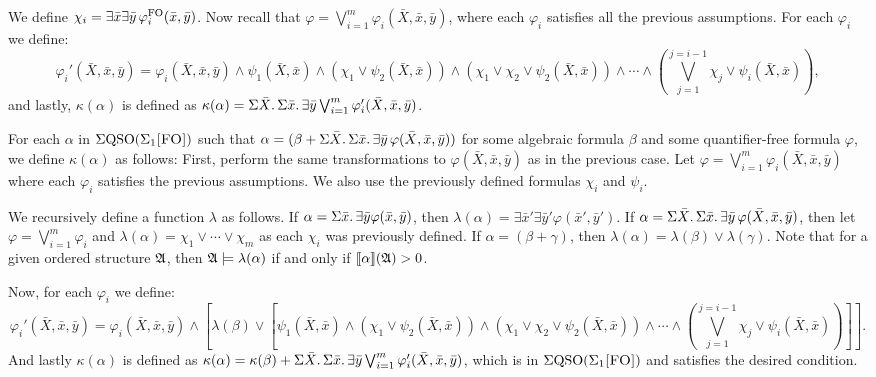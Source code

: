 We define $\chi_i = \exists\bar{x}\exists\bar{y}\,\varphi^{{\rm FO}}_i(\bar{x},\bar{y})$. Now recall that $\varphi = \bigvee_{i = 1}^m\varphi_i(\bar{X},\bar{x},\bar{y})$, where each $\varphi_i$ satisfies all the previous assumptions. For each $\varphi_i$ we define:
$$
\varphi_i'(\bar{X},\bar{x},\bar{y}) = \varphi_i(\bar{X},\bar{x},\bar{y})\wedge\psi_1(\bar{X},\bar{x})\wedge(\chi_1\vee\psi_2(\bar{X},\bar{x}))\wedge(\chi_1\vee\chi_2\vee\psi_2(\bar{X},\bar{x}))\wedge\cdots\wedge(
\bigvee_{j = 1}^{j = i-1}\chi_j\vee\psi_i(\bar{X},\bar{x})),
$$
and lastly, $\kappa(\alpha)$ is defined as $\kappa(\alpha) = \Sigma{\bar{X}}.\,\Sigma{\bar{x}}.\,\exists\bar{y}\bigvee_{i = 1}^m\varphi_i'(\bar{X},\bar{x},\bar{y})$.

\vspace{1em}

For each $\alpha$ in $\Sigma{\rm QSO}(\Sigma_{1}\textsc{[FO]})$ such that $\alpha = (\beta + \Sigma{\bar{X}}.\,\Sigma{\bar{x}}.\,\exists\bar{y}\,\varphi(\bar{X},\bar{x},\bar{y}))$ for some algebraic formula $\beta$ and some quantifier-free formula $\varphi$, we define $\kappa(\alpha)$ as follows: First, perform the same transformations to $\varphi(\bar{X},\bar{x},\bar{y})$ as in the previous case. Let $\varphi = \bigvee_{i = 1}^m\varphi_i(\bar{X},\bar{x},\bar{y})$ where each $\varphi_i$ satisfies the previous assumptions. We also use the previously defined formulas $\chi_i$ and $\psi_i$. 

We recursively define a function $\lambda$ as follows. If $\alpha = \Sigma{\bar{x}}.\,\exists\bar{y}\varphi(\bar{x},\bar{y})$, then $\lambda(\alpha) = \exists\bar{x}'\exists\bar{y}'\varphi(\bar{x}',\bar{y}')$. If $\alpha = \Sigma{\bar{X}}.\,\Sigma{\bar{x}}.\,\exists\bar{y}\,\varphi(\bar{X},\bar{x},\bar{y})$, then let $\varphi = \bigvee_{i = 1}^{m}\varphi_i$ and $\lambda(\alpha) = \chi_1\vee\cdots\vee\chi_m$ as each $\chi_i$ was previously defined. If $\alpha = (\beta + \gamma)$, then $\lambda(\alpha) = \lambda(\beta) \vee \lambda(\gamma)$. Note that for a given ordered structure $\mathfrak{A}$, then $\mathfrak{A}\models\lambda(\alpha)$ if and only if ${\llbracket{}{\alpha}\rrbracket}(\mathfrak{A}) > 0$.

Now, for each $\varphi_i$ we define:
$$
\varphi_i'(\bar{X},\bar{x},\bar{y}) = \varphi_i(\bar{X},\bar{x},\bar{y})\wedge[\lambda(\beta)\vee[\psi_1(\bar{X},\bar{x})\wedge(\chi_1\vee\psi_2(\bar{X},\bar{x}))\wedge(\chi_1\vee\chi_2\vee\psi_2(\bar{X},\bar{x}))\wedge\cdots\wedge(
\bigvee_{j = 1}^{j = i-1}\chi_j\vee\psi_i(\bar{X},\bar{x}))]].
$$
And lastly $\kappa(\alpha)$ is defined as $\kappa(\alpha) = \kappa(\beta) + \Sigma{\bar{X}}.\,\Sigma{\bar{x}}.\,\exists\bar{y}\bigvee_{i = 1}^m\varphi_i'(\bar{X},\bar{x},\bar{y})$, which is in $\Sigma{\rm QSO}(\Sigma_{1}\textsc{[FO]})$ and satisfies the desired condition.

